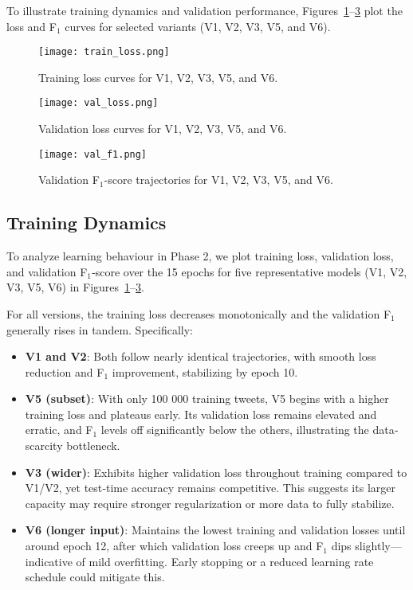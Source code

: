 \documentclass[twocolumn,superscriptaddress,aps]{revtex4-1}
\begin{document}
To illustrate training dynamics and validation performance, Figures~\ref{fig:train_loss}–\ref{fig:val_f1} plot the loss and F$_1$ curves for selected variants (V1, V2, V3, V5, and V6).

\begin{figure}[t]
  \centering
  \texttt{[image: train\_loss.png]}
  \caption{Training loss curves for V1, V2, V3, V5, and V6.}
  \label{fig:train_loss}
\end{figure}

\begin{figure}[t]
  \centering
  \texttt{[image: val\_loss.png]}
  \caption{Validation loss curves for V1, V2, V3, V5, and V6.}
  \label{fig:val_loss}
\end{figure}

\begin{figure}[t]
  \centering
  \texttt{[image: val\_f1.png]}
  \caption{Validation F$_1$-score trajectories for V1, V2, V3, V5, and V6.}
  \label{fig:val_f1}
\end{figure}

\subsection{Training Dynamics}

To analyze learning behaviour in Phase 2, we plot training loss, validation loss, and validation F$_1$‐score over the 15 epochs for five representative models (V1, V2, V3, V5, V6) in Figures~\ref{fig:train_loss}–\ref{fig:val_f1}.

For all versions, the training loss decreases monotonically and the validation F$_1$ generally rises in tandem. Specifically:

\begin{itemize}
  \item \textbf{V1 and V2}: Both follow nearly identical trajectories, with smooth loss reduction and F$_1$ improvement, stabilizing by epoch 10.
  \item \textbf{V5 (subset)}: With only 100 000 training tweets, V5 begins with a higher training loss and plateaus early. Its validation loss remains elevated and erratic, and F$_1$ levels off significantly below the others, illustrating the data‐scarcity bottleneck.
  \item \textbf{V3 (wider)}: Exhibits higher validation loss throughout training compared to V1/V2, yet test‐time accuracy remains competitive. This suggests its larger capacity may require stronger regularization or more data to fully stabilize.
  \item \textbf{V6 (longer input)}: Maintains the lowest training and validation losses until around epoch 12, after which validation loss creeps up and F$_1$ dips slightly—indicative of mild overfitting. Early stopping or a reduced learning rate schedule could mitigate this.
\end{itemize}
\end{document}
